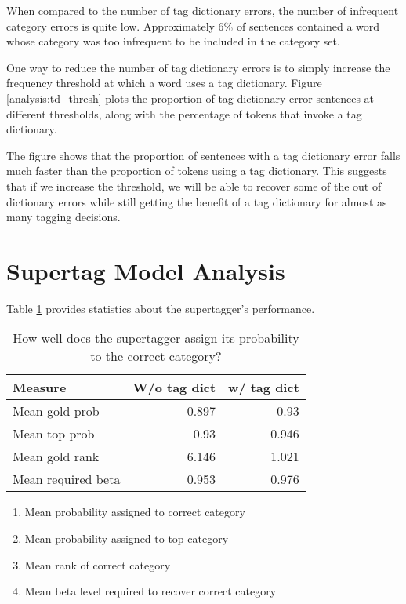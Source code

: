 When compared to the number of tag dictionary errors, the number of infrequent category errors is quite low. Approximately 6\% of sentences contained a word whose category was too infrequent to be included in the category set.

One way to reduce the number of tag dictionary errors is to simply increase the frequency threshold at which a word uses a tag dictionary. Figure \ref{analysis:td_thresh} plots the proportion of tag dictionary error sentences at different thresholds, along with the percentage of tokens that invoke a tag dictionary.

The figure shows that the proportion of sentences with a tag dictionary error falls much faster than the proportion of tokens using a tag dictionary. This suggests that if we increase the threshold, we will be able to recover some of the out of dictionary errors while still getting the benefit of a tag dictionary for almost as many tagging decisions. 

\begin{figure}
\end{figure}


\section{Supertag Model Analysis}

Table \ref{analysis:stag_model} provides statistics about the supertagger's performance.

\begin{table}\centering
\begin{tabular}{l|r|r}
Measure & W/o tag dict & w/ tag dict\\
\hline
Mean gold prob & 0.897 & 0.93\\
Mean top prob & 0.93 & 0.946\\
Mean gold rank & 6.146 & 1.021\\
Mean required beta & 0.953 & 0.976\\
\end{tabular}\label{analysis:stag_model}\caption{How well does the supertagger assign its probability to the correct category?}
\end{table}

\begin{enumerate}
\item Mean probability assigned to correct category
\item Mean probability assigned to top category
\item Mean rank of correct category
\item Mean beta level required to recover correct category
\end{enumerate}

